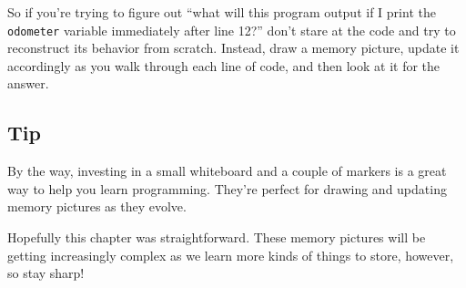 So if you're trying to figure out ``what will this program output if I print
the \texttt{odometer} variable immediately after line 12?'' don't stare at the
code and try to reconstruct its behavior from scratch. Instead, draw a memory
picture, update it accordingly as you walk through each line of code, and then
look at it for the answer.

\subsection{Tip}

By the way, investing in a small whiteboard and a couple of markers is a great
way to help you learn programming. They're perfect for drawing and updating
memory pictures as they evolve.

Hopefully this chapter was straightforward. These memory pictures will be
getting increasingly complex as we learn more kinds of things to store,
however, so stay sharp!
